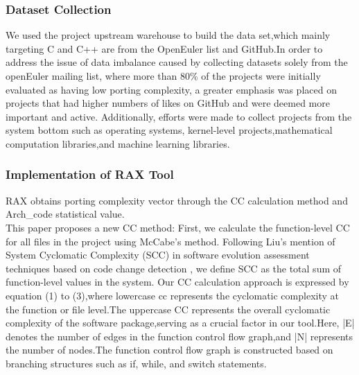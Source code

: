 \documentclass[sigconf,screen,review,anonymous]{acmart}
\begin{document}
\subsubsection{Dataset Collection}
We used the project upstream warehouse to build the data set,which mainly targeting C and C++ are from the OpenEuler list and GitHub\citep{stage2023}.In order to address the issue of data imbalance caused by collecting datasets solely from the openEuler mailing list, where more than 80\% of the projects were initially evaluated as having low porting complexity, a greater emphasis was placed on projects that had higher numbers of likes on GitHub and were deemed more important and active. Additionally, efforts were made to collect projects from the system bottom such as operating systems, kernel-level projects,mathematical computation libraries,and machine learning libraries.

\subsubsection{Implementation of RAX Tool}
RAX obtains porting complexity vector through the CC calculation method and Arch\_code statistical value.\\
This paper proposes a new CC method:
 First, we calculate the function-level CC for all files in the project using McCabe's method. Following Liu's mention of System Cyclomatic Complexity (SCC) in software evolution assessment techniques based on code change detection \cite{liuhuihui00}, we define SCC as the total sum of function-level values in the system.
  Our CC calculation approach is expressed by equation (1) to (3),where lowercase cc represents the cyclomatic complexity at the function or file level.The uppercase CC represents the overall cyclomatic complexity of the software package,serving as a crucial factor in our tool.Here, |E| denotes the number of edges in the function control flow graph,and |N| represents the number of nodes.The function control flow graph is constructed based on branching structures such as if, while, and switch statements. 
  
\end{document}
